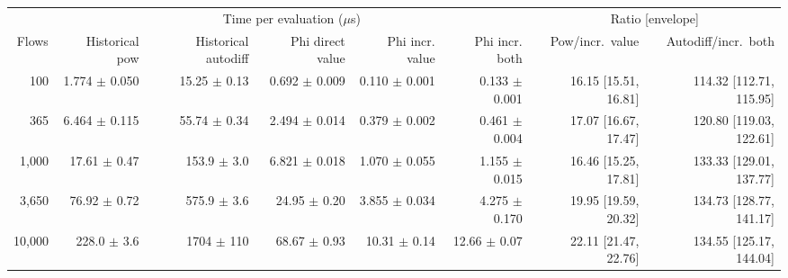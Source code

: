 \begin{tabular}{rrrrrrrr}
\toprule
 & \multicolumn{5}{c}{Time per evaluation ($\mu$s)} & \multicolumn{2}{c}{Ratio [envelope]} \\
\cmidrule(lr){2-6}\cmidrule(lr){7-8}
Flows & Historical pow & Historical autodiff & Phi direct value & Phi incr. value & Phi incr. both & Pow/incr.\ value & Autodiff/incr.\ both \\
\midrule
100 & 1.774 $\pm$ 0.050 & 15.25 $\pm$ 0.13 & 0.692 $\pm$ 0.009 & 0.110 $\pm$ 0.001 & 0.133 $\pm$ 0.001 & 16.15 [15.51, 16.81] & 114.32 [112.71, 115.95] \\
365 & 6.464 $\pm$ 0.115 & 55.74 $\pm$ 0.34 & 2.494 $\pm$ 0.014 & 0.379 $\pm$ 0.002 & 0.461 $\pm$ 0.004 & 17.07 [16.67, 17.47] & 120.80 [119.03, 122.61] \\
1,000 & 17.61 $\pm$ 0.47 & 153.9 $\pm$ 3.0 & 6.821 $\pm$ 0.018 & 1.070 $\pm$ 0.055 & 1.155 $\pm$ 0.015 & 16.46 [15.25, 17.81] & 133.33 [129.01, 137.77] \\
3,650 & 76.92 $\pm$ 0.72 & 575.9 $\pm$ 3.6 & 24.95 $\pm$ 0.20 & 3.855 $\pm$ 0.034 & 4.275 $\pm$ 0.170 & 19.95 [19.59, 20.32] & 134.73 [128.77, 141.17] \\
10,000 & 228.0 $\pm$ 3.6 & 1704 $\pm$ 110 & 68.67 $\pm$ 0.93 & 10.31 $\pm$ 0.14 & 12.66 $\pm$ 0.07 & 22.11 [21.47, 22.76] & 134.55 [125.17, 144.04] \\
\bottomrule
\end{tabular}
